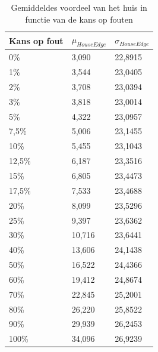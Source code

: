 \documentclass[conference]{IEEEtran}
\begin{document}
\begin{table}[H]
\centering
\begin{tabular}{|l|l|l|}
\hline
Kans op fout & $\mu_{HouseEdge}$ & $\sigma_{HouseEdge}$\\
\hline
0\% & 3,090 & 22,8915\\
1\% & 3,544 & 23,0405\\
2\% & 3,708 & 23,0394\\
3\% & 3,818 & 23,0014\\
5\% & 4,322 & 23,0957\\
7,5\% & 5,006 & 23,1455\\
10\% & 5,455 & 23,1043\\
12,5\% & 6,187 & 23,3516\\
15\% & 6,805 & 23,4473\\
17,5\% & 7,533 & 23,4688\\
20\% & 8,099 & 23,5296\\
25\% & 9,397 & 23,6362\\
30\% & 10,716 & 23,6441\\
40\% & 13,606 & 24,1438\\
50\% & 16,522 & 24,4366\\
60\% & 19,412 & 24,8674\\
70\% & 22,845 & 25,2001\\
80\% & 26,220 & 25,8522\\
90\% & 29,939 & 26,2453\\
100\% & 34,096 & 26,9239\\
\hline
\end{tabular}
\caption{Gemiddeldes voordeel van het huis in functie van de kans op fouten}
\label{tab:gemiddeldesMiskansen}
\end{table}

%
%
\end{document}
